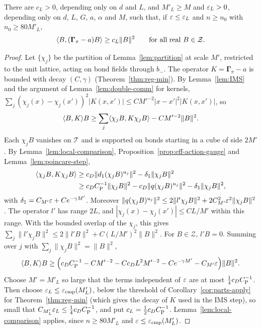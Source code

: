 \begin{theorem}\label{thm:step-coercive}
There are $c_L>0$, depending only on $d$ and $L$, and $M'_L\ge M$ and $\varepsilon_L>0$, depending only on $d$, $L$, $G$, $a$, $\alpha$ and $M$, such that, if $\varepsilon\le\varepsilon_L$ and $n\ge n_0$ with $n_0\ge80M'_L$,
\[
\langle B,(\boldsymbol\Gamma_\pi-a)B\rangle\ge c_L\|B\|^2\qquad\text{for all real }B\in\mathcal Z.
\]
\end{theorem}

\begin{proof}
Let $\{\chi_j\}$ be the partition of Lemma~\ref{lem:partition} at scale $M'$, restricted to the unit lattice, acting on bond fields through $b_-$. The operator $K=\boldsymbol\Gamma_\pi-a$ is bounded with decay $(C,\gamma)$ (Theorem~\ref{thm:reg-min}). By Lemma~\ref{lem:IMS} and the argument of Lemma~\ref{lem:double-comm} for kernels, $\sum_j(\chi_j(x)-\chi_j(x'))^2|K(x,x')|\le CM'^{-2}|x-x'|^2|K(x,x')|$, so
\[
\langle B,K\rangle B\ge\sum_j\langle \chi_jB,K\chi_jB\rangle-CM'^{-2}\|B\|^2 .
\]
Each $\chi_jB$ vanishes on $\mathcal T$ and is supported on bonds starting in a cube of side $2M'$. By Lemma~\ref{lem:local-comparison}, Proposition~\ref{prop:eff-action-gauge} and Lemma~\ref{lem:poincare-step},
\[
\begin{aligned}
\langle \chi_jB,K\chi_jB\rangle&\ge c_D\|d_1(\chi_jB)^{u_j}\|^2-\delta_1\|\chi_jB\|^2\\
&\ge c_DC_{\rm P}^{-1}\|\chi_jB\|^2-c_D\|q(\chi_jB)^{u_j}\|^2-\delta_1\|\chi_jB\|^2,
\end{aligned}
\]
with $\delta_1=C_{M'}\varepsilon+Ce^{-\gamma M'}$. Moreover $\|q(\chi_jB)^{u_j}\|^2\le2\|l'\chi_jB\|^2+2C_{M'}^2\varepsilon^2\|\chi_jB\|^2$. The operator $l'$ has range $2L$, and $|\chi_j(x)-\chi_j(x')|\le CL/M'$ within this range. With the bounded overlap of the $\chi_j$, this gives $\sum_j\|l'\chi_jB\|^2\le2\|l'B\|^2+C(L/M')^2\|B\|^2$. For $B\in\mathcal Z$, $l'B=0$. Summing over $j$ with $\sum_j\|\chi_jB\|^2=\|B\|^2$,
\[
\langle B,K\rangle B\ge\Big(c_DC_{\rm P}^{-1}-CM'^{-2}-Cc_DL^2M'^{-2}-Ce^{-\gamma M'}-C_{M'}\varepsilon\Big)\|B\|^2 .
\]
Choose $M'=M'_L$ so large that the terms independent of $\varepsilon$ are at most $\frac14c_DC_{\rm P}^{-1}$. Then choose $\varepsilon_L\le\varepsilon_{\rm cmp}(M'_L)$, below the threshold of Corollary~\ref{cor:parts-apply} for Theorem~\ref{thm:reg-min} (which gives the decay of $K$ used in the IMS step), so small that $C_{M'_L}\varepsilon_L\le\frac14c_DC_{\rm P}^{-1}$, and put $c_L=\frac12c_DC_{\rm P}^{-1}$. Lemma~\ref{lem:local-comparison} applies, since $n\ge80M'_L$ and $\varepsilon\le\varepsilon_{\rm cmp}(M'_L)$.
\end{proof}

